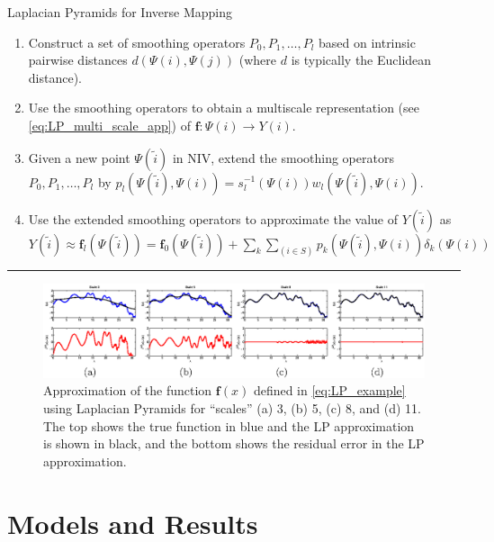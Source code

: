 \begin{algorithm}[th!]
\caption{Laplacian Pyramids for Inverse Mapping}
\begin{enumerate}

\item
Construct a set of smoothing operators $P_0, P_1, \ldots, P_l$  based on intrinsic pairwise distances $d(\Psi(i),\Psi(j))$ (where $d$ is typically the Euclidean distance).

\item
Use the smoothing operators to obtain a multiscale representation (see \eqref{eq:LP_multi_scale_app}) of $\mathbf{f}:\Psi(i) \rightarrow Y(i)$.

\item Given a new point $\Psi(\tilde{i})$ in NIV, extend the smoothing operators $P_0, P_1, \ldots, P_l$  by
$p_l(\Psi(\tilde{i}), \Psi(i)) = s_l^{-1}(\Psi(i)) w_l(\Psi(\tilde{i}),\Psi(i))$.

\item
Use the extended smoothing operators to approximate the value of $Y(\tilde{i})$ as $Y(\tilde{i}) \approx \mathbf{f}_l(\Psi(\tilde{i})) = \mathbf{f}_0(\Psi(\tilde{i})) + \sum_{k}\sum_{(i \in S)}p_k(\Psi(\tilde{i}), \Psi(i))\delta_k(\Psi(i))$

\end{enumerate}
\hrule
\label{algo_LP}
\end{algorithm}


\begin{figure}[t]
\includegraphics[width=6in]{fig2}
\caption[Function approximation using Laplacian Pyramids at different scales]{Approximation of the function $\mathbf{f}(x)$ defined in \eqref{eq:LP_example} using Laplacian Pyramids for ``scales'' (a) 3, (b) 5, (c) 8, and (d) 11. The top shows the true function in blue and the LP approximation is shown in black, and the bottom shows the residual error in the LP approximation.}
\label{fig:LP_ex}
\end{figure}

\section{Models and Results} \label{sec:examples}

